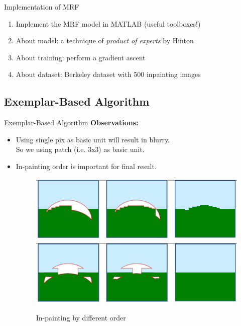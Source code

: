 \documentclass{beamer}
\begin{document}
\begin{frame}{Implementation of MRF}
\begin{enumerate}
\item Implement the MRF model in MATLAB (useful toolboxes!)
\item About model: a technique of \emph{product of experts} by Hinton
\item About training: perform a gradient ascent
\item About dataset: Berkeley dataset with 500 inpainting images
\end{enumerate}
\end{frame}

\subsection{Exemplar-Based Algorithm}
\begin{frame}{Exemplar-Based Algorithm}
	\textbf{Observations:}
	\begin{itemize}[<+->]
		\item Using single pix as basic unit will result in blurry. \\So we using patch (i.e. 3x3) as basic unit.
		\item In-painting order is important for final result. 
		\begin{figure}
			\centering
			\includegraphics[width=0.8\linewidth]{order1.png}\\
			\includegraphics[width=0.8\linewidth]{order2.png}
			\caption{In-painting by different order}
		\end{figure}
	\end{itemize}
\end{frame}
%
\end{document}
